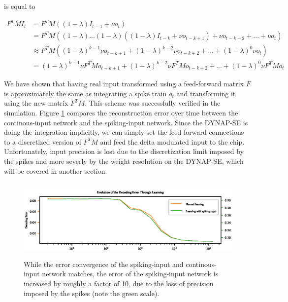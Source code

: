 \documentclass[twoside,11pt]{article}
\begin{document}
is equal to

\begin{equation*}
  \begin{split}
      F^T M I_t & = F^T M ((1-\lambda) I_{t-1} + \nu o_t) \\
      & = F^T M((1-\lambda) ... (1-\lambda)( (1-\lambda) I_{t-k} + \nu o_{t-k+1}) + \nu o_{t-k+2} + ... + \nu o_t) \\
      & \approx F^T M((1-\lambda)^{k-1}\nu o_{t-k+1} + (1-\lambda)^{k-2}\nu o_{t-k+2} + ... + (1-\lambda)^{0}\nu o_{t}) \\
      & = (1-\lambda)^{k-1}\nu F^TMo_{t-k+1} + (1-\lambda)^{k-2}\nu F^TMo_{t-k+2} + ... + (1-\lambda)^0 \nu F^TMo_t
  \end{split}
\end{equation*}

We have shown that having real input transformed using a feed-forward matrix $F$ is approximately the same
as integrating a spike train $o_t$ and transforming it using the new matrix $F^TM$. This
scheme was successfully verified in the simulation. Figure \ref{fig:spiking_vs_continous} compares the reconstruction error over time
between the continous-input network and the spiking-input network.
Since the DYNAP-SE is doing the integration implicitly, we can simply set the feed-forward
connections to a discretized version of $F^TM$ and feed the delta modulated input to the chip. Unfortunately,
input precision is lost due to the discretization limit imposed by the spikes and more severly by the
weight resolution on the DYNAP-SE, which will be covered in another section.

\begin{figure}[!htb]
  \includegraphics[width = \columnwidth, height=4cm]{figures/error_convergence_use_spiking_vs_normal.eps}
  \caption{While the error convergence of the spiking-input and continous-input network matches,
  the error of the spiking-input network is increased by roughly a factor of 10, due to the
  loss of precision imposed by the spikes (note the green scale).}
  \label{fig:spiking_vs_continous}
\end{figure}
\end{document}
